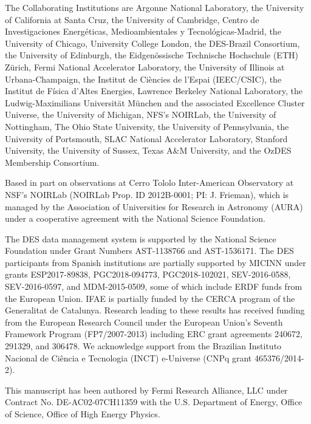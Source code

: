 \documentclass[fleqn,usenatbib]{mnras}
\begin{document}
The Collaborating Institutions are Argonne National Laboratory, the University of California at Santa Cruz, the University of Cambridge, Centro de Investigaciones Energ{\'e}ticas, 
Medioambientales y Tecnol{\'o}gicas-Madrid, the University of Chicago, University College London, the DES-Brazil Consortium, the University of Edinburgh, 
the Eidgen{\"o}ssische Technische Hochschule (ETH) Z{\"u}rich, 
Fermi National Accelerator Laboratory, the University of Illinois at Urbana-Champaign, the Institut de Ci{\`e}ncies de l'Espai (IEEC/CSIC), 
the Institut de F{\'i}sica d'Altes Energies, Lawrence Berkeley National Laboratory, the Ludwig-Maximilians Universit{\"a}t M{\"u}nchen and the associated Excellence Cluster Universe, 
the University of Michigan, NFS's NOIRLab, the University of Nottingham, The Ohio State University, the University of Pennsylvania, the University of Portsmouth, 
SLAC National Accelerator Laboratory, Stanford University, the University of Sussex, Texas A\&M University, and the OzDES Membership Consortium.

Based in part on observations at Cerro Tololo Inter-American Observatory at NSF’s NOIRLab (NOIRLab Prop. ID 2012B-0001; PI: J. Frieman), which is managed by the Association of Universities for Research in Astronomy (AURA) under a cooperative agreement with the National Science Foundation.

The DES data management system is supported by the National Science Foundation under Grant Numbers AST-1138766 and AST-1536171.
The DES participants from Spanish institutions are partially supported by MICINN under grants ESP2017-89838, PGC2018-094773, PGC2018-102021, SEV-2016-0588, SEV-2016-0597, and MDM-2015-0509, some of which include ERDF funds from the European Union. IFAE is partially funded by the CERCA program of the Generalitat de Catalunya.
Research leading to these results has received funding from the European Research
Council under the European Union's Seventh Framework Program (FP7/2007-2013) including ERC grant agreements 240672, 291329, and 306478.
We  acknowledge support from the Brazilian Instituto Nacional de Ci\^encia
e Tecnologia (INCT) e-Universe (CNPq grant 465376/2014-2).

This manuscript has been authored by Fermi Research Alliance, LLC under Contract No. DE-AC02-07CH11359 with the U.S. Department of Energy, Office of Science, Office of High Energy Physics.


\end{document}
